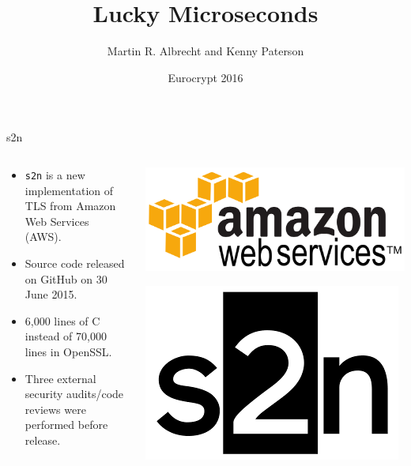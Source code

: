 \documentclass[presentation,smaller]{beamer}
\institute{Information Security Group, Royal Holloway, University of London}
\author{\alert{Martin R. Albrecht} and Kenny Paterson}
\date{Eurocrypt 2016}
\title{Lucky Microseconds}
\begin{document}
\maketitle

\begin{frame}[fragile,label={sec:orgheadline1}]{s2n}
 \begin{columns}
\begin{column}{0.6\columnwidth}
\begin{itemize}
\item \texttt{s2n} is a new implementation of TLS from Amazon Web Services (AWS).
\item Source code released on GitHub on 30 June 2015.
\item 6,000 lines of C instead of 70,000 lines in OpenSSL.
\item Three external security audits/code reviews were performed before release.
\end{itemize}
\end{column}

\begin{column}{0.4\columnwidth}
\includegraphics[width=.9\linewidth]{./s2n-eurocrypt-aws.png}

\includegraphics[width=.9\linewidth]{./s2n-eurocrypt-s2n.png}
\end{column}
\end{columns}
\end{frame}
\end{document}

